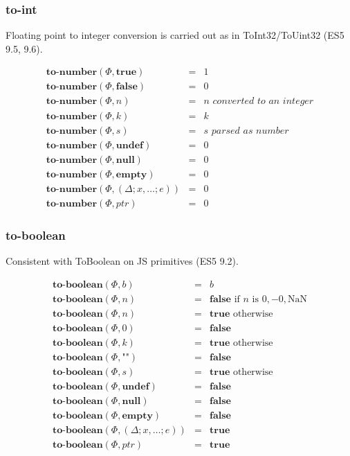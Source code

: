 \documentclass[draft, 10pt]{article}
\newcommand{\expr}[0]{e}
\newcommand{\var}[0]{x}
\newcommand{\bool}[0]{b}
\newcommand{\num}[0]{n}
\newcommand{\intg}[0]{k}
\newcommand{\str}[0]{s}
\newcommand{\nan}[0]{\textrm{NaN}}
\newcommand{\undef}[0]{\textbf{undef}}
\newcommand{\nul}[0]{\textbf{null}}
\newcommand{\empt}[0]{\textbf{empty}}
\newcommand{\true}[0]{\textbf{true}}
\newcommand{\false}[0]{\textbf{false}}
\newcommand{\optonum}[0]{\textbf{to-number}}
\newcommand{\optobool}[0]{\textbf{to-boolean}}
\newcommand{\varenv}[0]{\Delta}
\newcommand{\heap}[0]{\Phi}
\newcommand{\closure}[3]{(#1; #2; #3)}
\newcommand{\heapptr}{ptr}
\newcommand{\rununop}[3]{#1(#2,#3)}
\begin{document}
\subsubsection{to-int}

Floating point to integer conversion is carried out as in ToInt32/ToUint32
(ES5 9.5, 9.6).

\[
\begin{array}{rcl}
\rununop{\optonum}{\heap}{\true} &=& 1 \\
\rununop{\optonum}{\heap}{\false} &=& 0 \\
\rununop{\optonum}{\heap}{\num} &=& \textit{$\num$ converted to an integer} \\
\rununop{\optonum}{\heap}{\intg} &=& \intg \\
\rununop{\optonum}{\heap}{\str} &=& \textit{$\str$ parsed as number} \\
\rununop{\optonum}{\heap}{\undef} &=& 0 \\
\rununop{\optonum}{\heap}{\nul} &=& 0 \\
\rununop{\optonum}{\heap}{\empt} &=& 0 \\
\rununop{\optonum}{\heap}{\closure{\varenv}{\var, \dots}{\expr}} &=& 0 \\
\rununop{\optonum}{\heap}{\heapptr} &=& 0
\end{array}
\]

\subsubsection{to-boolean}

Consistent with ToBoolean on JS primitives (ES5 9.2).

\[
\begin{array}{rcl}
\rununop{\optobool}{\heap}{\bool} &=& \bool \\
\rununop{\optobool}{\heap}{\num} &=& \false \textrm{ if $\num$ is $0, -0, \nan$} \\
\rununop{\optobool}{\heap}{\num} &=& \true \textrm{ otherwise} \\
\rununop{\optobool}{\heap}{0} &=& \false \\
\rununop{\optobool}{\heap}{\intg} &=& \true \textrm{ otherwise} \\
\rununop{\optobool}{\heap}{\texttt{""}} &=& \false \\
\rununop{\optobool}{\heap}{\str} &=& \true \textrm{ otherwise} \\
\rununop{\optobool}{\heap}{\undef} &=& \false \\
\rununop{\optobool}{\heap}{\nul} &=& \false \\
\rununop{\optobool}{\heap}{\empt} &=& \false \\
\rununop{\optobool}{\heap}{\closure{\varenv}{\var, \dots}{\expr}} &=& \true \\
\rununop{\optobool}{\heap}{\heapptr} &=& \true
\end{array}
\]
\end{document}
